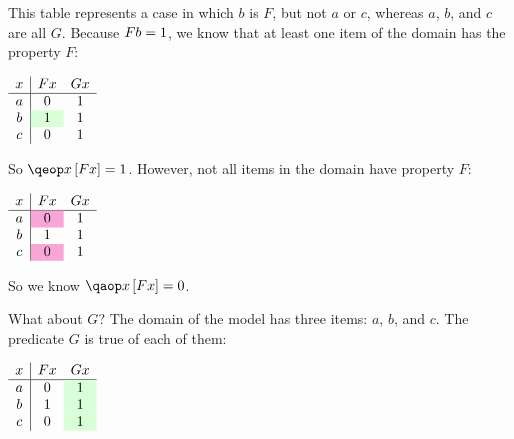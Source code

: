 \documentclass[PHIL101-Textbook.tex]{subfiles}
\begin{document}
 \noindent This table represents a case in which $b$ is $F$, but not $a$ or $c$, whereas $a$, $b$, and $c$ are all $G$. Because $\mathord{F}{b} = 1$, we know that at least one item of the domain has the property $F$:

  \begin{center}
  $\begin{array}{c|cc}
	 x & \atom F x & \atom G x\\ \hline
	 a &  \vF & \vT\\
	 b & \cellcolor{green!15} \vT & \vT\\
	 c &  \vF & \vT
   \end{array}$
 \end{center}

 \noindent So $\qeb{x}{\atom F x} = \vT$. However, not all items in the domain have property $F$:


 \begin{center}
  $\begin{array}{c|cc}
	 x & \atom F x & \atom G x\\ \hline
	 a &  \cellcolor{magenta!35}\vF & \vT\\
	 b & \vT & \vT\\
	 c &  \cellcolor{magenta!35}\vF & \vT
   \end{array}$
 \end{center}

 \noindent So we know $\qab{x}{\atom F x} = \vF$. 
 \pagebreak

%
% 


 \noindent What about $G$? The domain of the model has three items: $a$, $b$, and $c$. The predicate $G$ is true of each of them:

 \begin{center}
  $\begin{array}{c|cc}
	 x & \atom F x & \atom G x\\ \hline
	 a & \vF & \cellcolor{green!15}\vT\\
	 b & \vT &\cellcolor{green!15} \vT\\
	 c & \vF & \cellcolor{green!15}\vT
   \end{array}$
 \end{center}
\end{document}
